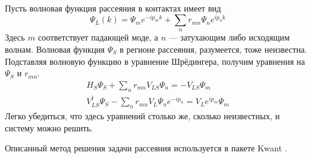 Пусть волновая функция рассеяния в контактах имеет вид
\begin{equation}
    \Psi_L(k) = \Psi_m e^{-ip_m k} + \sum_{n} r_{mn} \Psi_n e^{ip_n k}
\end{equation}
Здесь $m$ соответствует падающей моде, а $n$ --- затухающим либо исходящим волнам. Волновая 
функция $\Psi_S$ в регионе рассеяния, разумеется, тоже неизвестна. Подставляя волновую функцию
в уравнение Шрёдингера, получим уравнения на $\Psi_S$ и $r_{mn}$.
\begin{equation}
    \begin{gathered}
        H_S \Psi_S + \sum_n r_{mn} V_{LS} \Psi_n = -V_{LS} \Psi_m\\
        V_{LS}^\dagger\Psi_S  - \sum_n r_{mn}V_L \Psi_n e^{-ip_n} = V_L e^{ip_m} \Psi_m
    \end{gathered}
\end{equation}
Легко убедиться, что здесь уравнений столько же, сколько неизвестных, и систему можно решить.

Описанный метод решения задачи рассеяния используется в пакете Kwant \cite{Groth2014}.
